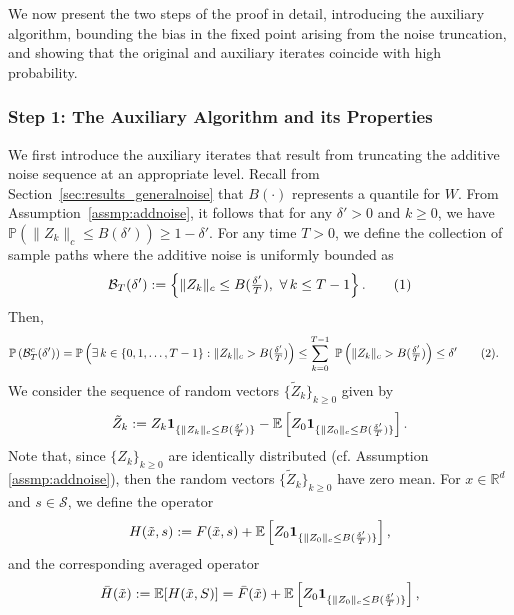 \documentclass{article}
\newcommand{\numberthis}{\addtocounter{equation}{1}\tag{\theequation}}
\newcommand{\lrset}[1]{\left\{ #1 \right\}}
\newcommand{\lrp}[1]{\left( #1 \right)}
\newcommand{\lrs}[1]{\left[ #1 \right]}
\newcommand{\E}[1]{\mathbb{E}\lrs{#1}}
\begin{document}
We now present the two steps of the proof in detail, introducing the auxiliary algorithm, bounding the bias in the fixed point arising from the noise truncation, and showing that the original and auxiliary iterates coincide with high probability.



\subsubsection{Step 1: The Auxiliary Algorithm and its Properties}\label{sec:auxalgotrunc}

We first introduce the auxiliary iterates that result from truncating the additive noise sequence at an appropriate level. Recall from Section~\ref{sec:results_generalnoise} that $B(\cdot)$ represents a quantile for $W$. From Assumption~\ref{assmp:addnoise}, it follows that for any $\delta'> 0$ and $k\geq 0$, we have  $\mathbb{P}\lrp{ \|Z_k\|_c \le B(\delta') } \ge 1-\delta'$. For any time $T > 0$, we define the collection of sample paths where the additive noise is uniformly bounded as
\[ \mathcal B_T(\delta') := \lrset{\|Z_k\|_c \le B({\tfrac{\delta'}{T}}),\,\, \forall \, k \leq T-1}. \numberthis\label{eq:BT}\]
Then,
\begin{align*} 
    \mathbb{P}\lrp{\mathcal B^c_T(\delta')} = \mathbb{P}\lrp{ \exists \, k \in \lrset{0,1,\dots, T-1}: \|Z_k\|_c > B ( \tfrac{\delta'}{T} ) } &\le \sum\limits_{k=0}^{T-1}~\mathbb{P}\lrp{ \|Z_k\|_c > B(\tfrac{\delta'}{T}) } \le \delta' \numberthis\label{eq:probbcomp}.  
\end{align*}
We consider the sequence of random vectors $\{\tilde{Z}_k\}_{k\geq 0}$ given by
\[ \tilde{Z}_k := Z_k {\bf 1}_{\{\|Z_k\|_c \le B(\frac{\delta'}{T})\}} - \mathbb{E}\left[Z_0 {\bf 1}_{\{\|Z_0\|_c \le B(\frac{\delta'}{T})\}}\right]. \]
Note that, since $\{Z_k\}_{k\geq 0}$ are identically distributed (cf. Assumption \ref{assmp:addnoise}), then the random vectors $\{\tilde{Z}_k\}_{k\geq 0}$ have zero mean. For $x\in\mathbb{R}^d$ and $s\in\mathcal{S}$, we define the operator
\[ H(\tilde{x},s) := F(\tilde{x}, s) + \E{Z_0 {\bf 1}_{\{\|Z_0\|_c \le B(\frac{\delta'}{T})\}}}, \]
and the corresponding averaged operator
\[\bar{H}(\tilde{x}) := \mathbb{E}[H(\tilde{x}, S)] = \bar{F}(\tilde{x}) + \E{Z_0 {\bf 1}_{\{\|Z_0\|_c \le B(\frac{\delta'}{T})\}}}, \] 
\end{document}
